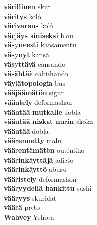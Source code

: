 \textbf{ värillinen  } skur \\
\textbf{ väritys  } koló \\
\textbf{ värivaraus  } koló \\
\textbf{ värjäys siniseksi  } blou \\
\textbf{ väsyneesti  } kansamentu \\
\textbf{ väsynyt  } kansá \\
\textbf{ väsyttävä  } cansando \\
\textbf{ väsähtää  } cabishando \\
\textbf{ väylätopologia  } bùs \\
\textbf{ vääjäämätön  } sigur \\
\textbf{ vääntely  } deformashon \\
\textbf{ vääntää mutkalle  } dobla \\
\textbf{ vääntää niskat nurin  } choka \\
\textbf{ vääntää  } dobla \\
\textbf{ väärennetty  } malu \\
\textbf{ väärentämätön  } outéntiko \\
\textbf{ väärinkäyttäjä  } adicto \\
\textbf{ väärinkäyttö  } abusu \\
\textbf{ vääristely  } deformashon \\
\textbf{ vääryydellä hankittu  } sushi \\
\textbf{ vääryys  } skuridat \\
\textbf{ väärä  } preto \\
\textbf{ Wahvey  } Yehova \\
